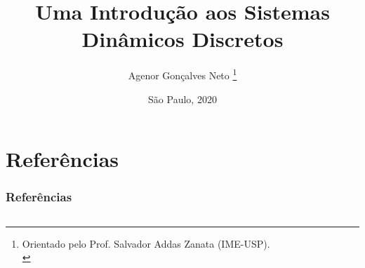 \documentclass[11pt, portuguese, aspectratio=1610]{beamer}
\title{Uma Introdução aos Sistemas Dinâmicos Discretos}\author{Agenor Gonçalves Neto \footnote{Orientado pelo Prof. Salvador Addas Zanata (IME-USP).\\}}
\date{São Paulo, 2020}
\begin{document}

\begin{frame}
\titlepage
\end{frame}







%



\section*{Referências}
\begin{frame}
\vspace{5pt}
\frametitle{Referências}
\begin{columns}
\column{\dimexpr\paperwidth-15pt}
\nocite{burns, devaney, holmgren}


\end{columns}
\end{frame}
\end{document}
